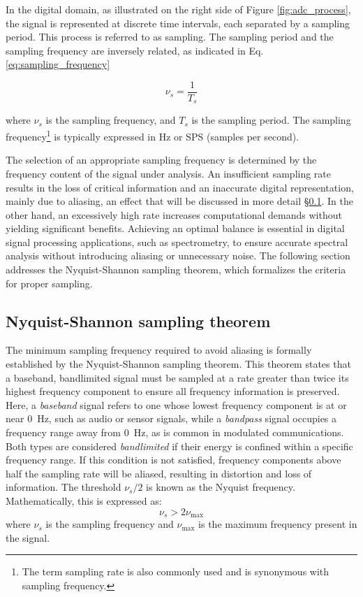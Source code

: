 In the digital domain, as illustrated on the right side of Figure \ref{fig:adc_process}, the signal is represented at discrete time intervals, each separated by a sampling period. This process is referred to as sampling. The sampling period and the sampling frequency are inversely related, as indicated in Eq. \ref{eq:sampling_frequency}

\begin{equation}
	\nu_s = \frac{1}{T_s}
	\label{eq:sampling_frequency}
\end{equation}

where $\nu_s$ is the sampling frequency, and $T_s$ is the sampling period. The sampling frequency\footnote{The term sampling rate is also commonly used and is synonymous with sampling frequency.} is typically expressed in Hz or SPS (samples per second).


The selection of an appropriate sampling frequency is determined by the frequency content of the signal under analysis. An insufficient sampling rate results in the loss of critical information and an inaccurate digital representation, mainly due to aliasing, an effect that will be discussed in more detail \S \ref{sec:nyquist_shannon}. In the other hand, an excessively high rate increases computational demands without yielding significant benefits. Achieving an optimal balance is essential in digital signal processing applications, such as spectrometry, to ensure accurate spectral analysis without introducing aliasing or unnecessary noise. The following section addresses the Nyquist-Shannon sampling theorem, which formalizes the criteria for proper sampling.

\subsection{Nyquist-Shannon sampling theorem}
\label{sec:nyquist_shannon}
The minimum sampling frequency required to avoid aliasing is formally established by the Nyquist-Shannon sampling theorem. This theorem states that a baseband, bandlimited signal must be sampled at a rate greater than twice its highest frequency component to ensure all frequency information is preserved. Here, a \emph{baseband} signal refers to one whose lowest frequency component is at or near 0~Hz, such as audio or sensor signals, while a \emph{bandpass} signal occupies a frequency range away from 0~Hz, as is common in modulated communications. Both types are considered \emph{bandlimited} if their energy is confined within a specific frequency range. If this condition is not satisfied, frequency components above half the sampling rate will be aliased, resulting in distortion and loss of information. The threshold $\nu_s/2$ is known as the Nyquist frequency. Mathematically, this is expressed as:
\begin{equation}
	\nu_s > 2\nu_{\text{max}}
	\label{eq:nyquist_condition}
\end{equation}
where $\nu_s$ is the sampling frequency and $\nu_{\text{max}}$ is the maximum frequency present in the signal.


